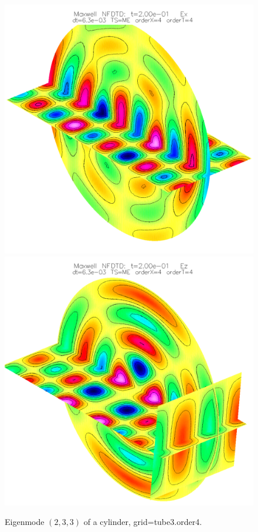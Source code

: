 \renewcommand{\figWidth}{.45\linewidth}
\begin{figure}
\begin{center}
\includegraphics[width=\figWidth]{figures/cylEigen-tube3-4-mode233-Ex}
\includegraphics[width=\figWidth]{figures/cylEigen-tube3-4-mode233-Ez}
\end{center}
\caption{Eigenmode $(2,3,3)$ of a cylinder, grid=tube3.order4.}
\end{figure}


